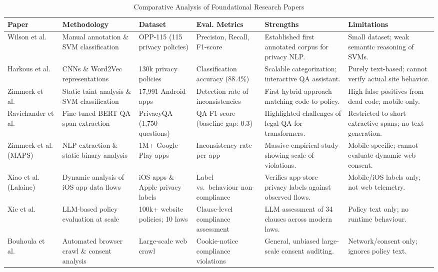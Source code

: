 \documentclass[11pt,a4paper]{article}
\begin{document}
\begin{table}[h]
\caption{Comparative Analysis of Foundational Research Papers}
\label{tab:comparison}
\centering
\begin{tabular}{p{2.3cm}p{2.3cm}p{2.2cm}p{2.3cm}p{3cm}p{3.2cm}}
\hline
\textbf{Paper} & \textbf{Methodology} & \textbf{Dataset} & \textbf{Eval. Metrics} & \textbf{Strengths} & \textbf{Limitations} \\
\hline
Wilson et al.~\cite{wilson-2016-opp115} & Manual annotation \& SVM classification & OPP-115 (115 privacy policies) & Precision, Recall, F1-score & Established first annotated corpus for privacy NLP. & Small dataset; weak semantic reasoning of SVMs. \\
\hline
Harkous et al.~\cite{harkous-2018-polisis} & CNNs \& Word2Vec representations & 130k privacy policies & Classification accuracy (88.4\%) & Scalable categorization; interactive QA assistant. & Purely text-based; cannot verify actual site behavior. \\
\hline
Zimmeck et al.~\cite{zimmeck-2017-mobileapps} & Static taint analysis \& SVM classification & 17,991 Android apps & Detection rate of inconsistencies & First hybrid approach matching code to policy. & High false positives from dead code; mobile only. \\
\hline
Ravichander et al.~\cite{ravichander-2019-privacyqa} & Fine-tuned BERT QA span extraction & PrivacyQA (1,750 questions) & QA F1-score (baseline gap: 0.3) & Highlighted challenges of legal QA for transformers. & Restricted to short extractive spans; no text generation. \\
\hline
Zimmeck et al. (MAPS)~\cite{zimmeck-2019-maps} & NLP extraction \& static binary analysis & 1M+ Google Play apps & Inconsistency rate per app & Massive empirical study showing scale of violations. & Mobile specific; cannot evaluate dynamic web consent. \\
\hline
Xiao et al. (Lalaine)~\cite{xiao-2023-lalaine} & Dynamic analysis of iOS app data flows & iOS apps \& Apple privacy labels & Label vs.\ behaviour non-compliance & Verifies app-store privacy labels against observed flows. & Mobile/iOS labels only; not web telemetry. \\
\hline
Xie et al.~\cite{xie-2025-llmpolicy} & LLM-based policy evaluation at scale & 100k+ website policies; 10 laws & Clause-level compliance assessment & LLM assessment of 34 clauses across modern laws. & Policy text only; no runtime behaviour. \\
\hline
Bouhoula et al.~\cite{bouhoula-2024-cookies} & Automated browser crawl \& consent analysis & Large-scale web crawl & Cookie-notice compliance violations & General, unbiased large-scale consent auditing. & Network/consent only; ignores policy text. \\

\end{tabular}
\end{table}
\end{document}
